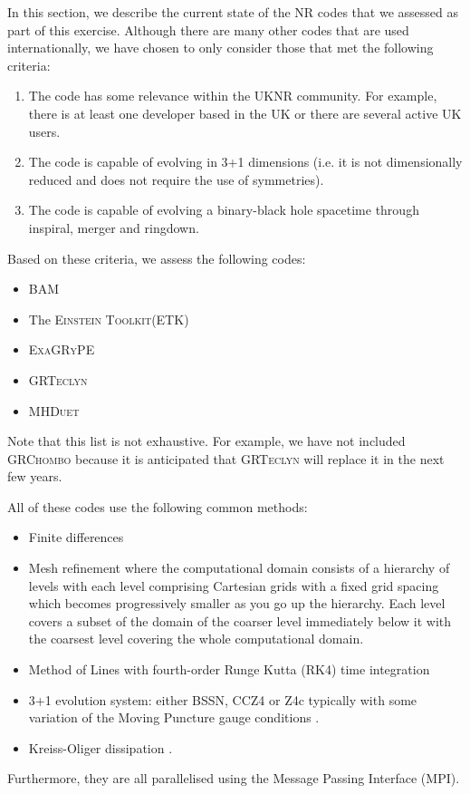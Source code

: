 \documentclass[12pt,a4paper]{article}
\numberwithin{figure}{subsection}
\newcommand{\bam}{\textsc{BAM}\xspace}
\newcommand{\einsteintoolkit}{\textsc{Einstein Toolkit}\xspace}
\newcommand{\etk}{\textsc{ETK}\xspace} %
\newcommand{\exagrype}{\textsc{ExaGRyPE}\xspace}
\newcommand{\grteclyn}{\textsc{GRTeclyn}\xspace}
\newcommand{\mhduet}{\textsc{MHDuet}\xspace}
\begin{document}
In this section, we describe the current state of the NR codes that we assessed
as part of this exercise. Although there are many other codes that are used
internationally,  we have chosen to only consider those that met the following
criteria:
\begin{enumerate}
    \item The code has some relevance within the UKNR community. For example,
    there is at least one developer based in the UK or there are several active UK users.
    \item The code is capable of evolving in 3+1 dimensions (i.e. it is not
    dimensionally reduced and does not require the use of symmetries).
    \item The code is capable of evolving a binary-black hole spacetime through
    inspiral, merger and ringdown.
\end{enumerate}
Based on these criteria, we assess the following codes:
\begin{itemize}
    \item \bam
    \cite{Bruegmann:1997uc,Bruegmann:2003aw,Husa:2007hp,Bruegmann:2006ulg}
    \item The \einsteintoolkit(\etk) \cite{Loffler:2011ay,EinsteinToolkit:2025_05}
    \item \exagrype \cite{Zhang:2024fye}
    \item \grteclyn \cite{GRTeclyn:2026}
    \item \mhduet \cite{Palenzuela:2025ucx}
\end{itemize}
Note that this list is not exhaustive. For example, we have not
included \textsc{GRChombo} \cite{Clough:2015sqa,Andrade:2021rbd} because it is
anticipated that \grteclyn will replace it in the next few years.

All of these codes use the following common methods:
\begin{itemize}
    \item Finite differences
    \item Mesh refinement where the computational domain consists of a hierarchy
    of levels with each level comprising Cartesian grids with a fixed grid
    spacing which becomes progressively smaller as you go up the hierarchy.
    Each level covers a subset of the domain of the coarser level immediately
    below it with the coarsest level covering the whole computational domain.
    \item Method of Lines with fourth-order Runge Kutta (RK4) time integration
    \item 3+1 evolution system: either BSSN, CCZ4 or Z4c typically with some
    variation of the Moving Puncture gauge conditions
    \cite{Campanelli:2005dd,Baker:2005vv}.
    \item Kreiss-Oliger dissipation \cite{Kreiss:1973}.
\end{itemize}
Furthermore, they are all parallelised using the Message Passing Interface
(MPI).
\end{document}
